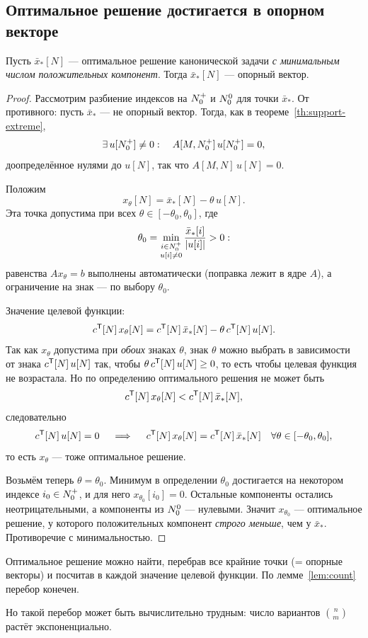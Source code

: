
\subsection{Оптимальное решение достигается в опорном векторе}

\begin{theorem}\label{th:optimal-is-support}
Пусть $\bar{x}_*[N]$ — оптимальное решение канонической задачи \emph{с минимальным
числом положительных компонент}. Тогда $\bar{x}_*[N]$ — опорный вектор.
\end{theorem}

\begin{proof}
Рассмотрим разбиение индексов на $N_0^{+}$ и $N_0^{0}$ для точки $\bar{x}_*$. От
противного: пусть $\bar{x}_*$ — не опорный вектор. Тогда, как в
теореме~\ref{th:support-extreme},
\[
  \exists\, u[N_0^{+}] \ne 0 : \quad A[M,N_0^{+}]\, u[N_0^{+}] = 0 ,
\]
доопределённое нулями до $u[N]$, так что $A[M,N]\,u[N] = 0$.

Положим
\[
  x_\theta[N] = \bar{x}_*[N] - \theta\, u[N] .
\]
Эта точка допустима при всех $\theta \in [-\theta_0, \theta_0]$, где
\[
  \theta_0 = \min_{\substack{i \in N_0^{+} \\ u[i] \ne 0}}
             \frac{\bar{x}_*[i]}{\left\lvert u[i] \right\rvert} > 0 :
\]
равенства $A x_\theta = b$ выполнены автоматически (поправка лежит в ядре $A$),
а ограничение на знак — по выбору $\theta_0$.

Значение целевой функции:
\[
  c^{\mathsf{T}}[N]\, x_\theta[N] = c^{\mathsf{T}}[N]\, \bar{x}_*[N] - \theta\, c^{\mathsf{T}}[N]\, u[N] .
\]
Так как $x_\theta$ допустима при \emph{обоих} знаках $\theta$, знак $\theta$ можно
выбрать в зависимости от знака $c^{\mathsf{T}}[N]\,u[N]$ так, чтобы
$\theta\, c^{\mathsf{T}}[N]\,u[N] \ge 0$, то есть чтобы целевая функция не возрастала. Но по
определению оптимального решения не может быть
\[
  c^{\mathsf{T}}[N]\, x_\theta[N] < c^{\mathsf{T}}[N]\, \bar{x}_*[N] ,
\]
следовательно
\[
  c^{\mathsf{T}}[N]\, u[N] = 0 \quad\implies\quad
  c^{\mathsf{T}}[N]\, x_\theta[N] = c^{\mathsf{T}}[N]\, \bar{x}_*[N]
  \quad \forall \theta \in [-\theta_0, \theta_0] ,
\]
то есть $x_\theta$ — тоже оптимальное решение.

Возьмём теперь $\theta = \theta_0$. Минимум в определении $\theta_0$ достигается на
некотором индексе $i_0 \in N_0^{+}$, и для него $x_{\theta_0}[i_0] = 0$. Остальные
компоненты остались неотрицательными, а компоненты из $N_0^{0}$ — нулевыми. Значит
$x_{\theta_0}$ — оптимальное решение, у которого положительных компонент
\emph{строго меньше}, чем у $\bar{x}_*$. Противоречие с минимальностью.
\end{proof}

\begin{corollary*}
Оптимальное решение можно найти, перебрав все крайние точки (= опорные векторы) и
посчитав в каждой значение целевой функции. По лемме~\ref{lem:count} перебор конечен.
\end{corollary*}

Но такой перебор может быть вычислительно трудным: число вариантов $\binom{n}{m}$
растёт экспоненциально.

